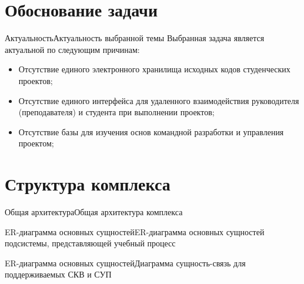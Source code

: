 \section{Обоснование задачи}
\begin{frame}{Актуальность}{Актуальность выбранной темы}
    Выбранная задача является актуальной по следующим причинам:
    \begin{itemize}
    \item Отсутствие единого электронного хранилища исходных кодов студенческих проектов;
    \item Отсутствие единого интерфейса для удаленного взаимодействия руководителя (преподавателя) и студента при выполнении проектов;
    \item Отсутствие базы для изучения основ командной разработки и управления проектом;
    \end{itemize}
\end{frame}

\section{Структура комплекса}

\begin{frame}{Общая архитектура}{Общая архитектура комплекса}

    \begin{figure}
        \label{fig:main_arch}
    \end{figure}
\end{frame}

\begin{frame}{ER-диаграмма основных сущностей}{ER-диаграмма основных сущностей подсистемы, представляющей учебный процесс}

    \begin{figure}
        \label{fig:er:general}
    \end{figure}

\end{frame}

\begin{frame}{ER-диаграмма основных сущностей}{Диаграмма сущность-связь для поддерживаемых СКВ и СУП}

\begin{figure}
    \label{fig:er:subtables}
\end{figure}

\end{frame}


